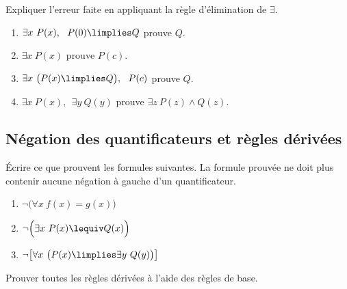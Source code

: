 \documentclass[11pt,class=report,crop=false]{standalone}
\begin{document}
\begin{exercicecours}
Expliquer l'erreur faite	en appliquant la règle d'élimination de $\exists$.
\begin{enumerate}
	\item $\exists x \ P(x), \ \ P(0) \limplies Q$ prouve $Q$. 
	
	\item $\exists x \ P(x)$ prouve $P(c)$. 
	
	\item $\exists x \ \big( P(x) \limplies Q \big), \ \ P(c)$ prouve $Q$.
	
	\item $\exists x \ P(x), \ \ \exists y \ Q(y)$ prouve $\exists z \ P(z) \land Q(z)$. 	 		
\end{enumerate}
\end{exercicecours}


\subsection*{Négation des quantificateurs et règles dérivées}


\begin{exercicecours}
Écrire ce que prouvent les formules suivantes. 
La formule prouvée ne doit plus contenir aucune négation à gauche d'un quantificateur.
\begin{enumerate}
	\item $\lnot \Big( \forall x \ f(x) = g(x) \Big)$
	
	\item $\lnot \Big( \exists x \ P(x) \lequiv Q(x) \Big)$
	
	\item $\lnot \big[ \forall x \ \big( P(x) \limplies \exists y \ Q(y) \big) \big]$
\end{enumerate}
\end{exercicecours}


\begin{exercicecours}
Prouver toutes les règles dérivées à l'aide des règles de base.	
\end{exercicecours}
\end{document}
